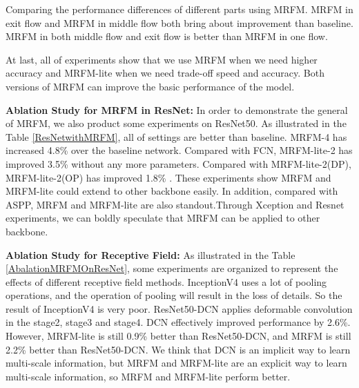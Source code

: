 \documentclass[final]{cvpr}
\begin{document}
Comparing the performance differences of different parts using MRFM. MRFM in exit flow and MRFM in middle flow both bring about improvement than baseline. MRFM in both middle flow and exit flow is better than MRFM in one flow.

At last, all of experiments show that we use MRFM when we need higher accuracy and MRFM-lite when we need trade-off speed and accuracy. Both versions of MRFM can improve the basic performance of the model.



\textbf{Ablation Study for MRFM in ResNet: } In order to demonstrate the general of MRFM, we also product some experiments on ResNet50. As illustrated in the Table \ref{ResNetwithMRFM}, all of settings are better than baseline. MRFM-4 has increased 4.8\% over the baseline network. Compared with FCN, MRFM-lite-2 has improved 3.5\% without any more parameters. Compared with MRFM-lite-2(DP), MRFM-lite-2(OP) has improved 1.8\% . These experiments show MRFM and MRFM-lite could extend to other backbone easily. In addition, compared with ASPP, MRFM and MRFM-lite are also standout.Through Xception and Resnet experiments, we can boldly speculate that MRFM can be applied to other backbone.


\begin{table}[htbp]
\begin{center}
\end{center}
\caption{In order to demonstrate the generalization ability of the MRFM better, ResNet experiments are conduct}
\label{ResNetwithMRFM}
\vspace{-1em}
\end{table}

\textbf{Ablation Study for Receptive Field: } As illustrated in the Table \ref{AbalationMRFMOnResNet}, some experiments are organized to represent the effects of different receptive field methods. InceptionV4 \cite{szegedy2017inception} uses a lot of pooling operations, and the operation of pooling will result in the loss of details. So the result of InceptionV4 \cite{szegedy2017inception} is very poor. ResNet50-DCN \cite{zhu2019deformable} applies deformable convolution in the stage2, stage3 and stage4. DCN \cite{zhu2019deformable} effectively improved performance by 2.6\%. However, MRFM-lite is still 0.9\% better than ResNet50-DCN, and MRFM is still 2.2\% better than ResNet50-DCN. We think that DCN is an implicit way to learn multi-scale information, but MRFM and MRFM-lite are an explicit way to learn multi-scale information, so MRFM and MRFM-lite perform better.
\end{document}
